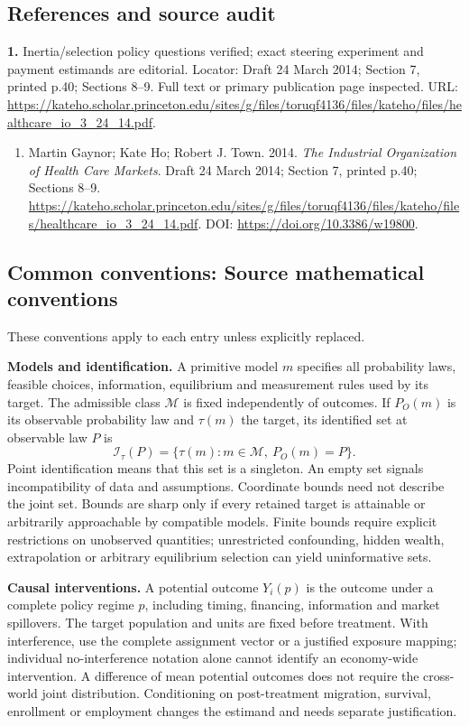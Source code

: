 \documentclass[11pt,a4paper]{article}
\begin{document}
\subsection*{References and source audit}
\textbf{1.} Inertia/selection policy questions verified; exact steering experiment and payment estimands are editorial. Locator: Draft 24 March 2014; Section 7, printed p.40; Sections 8–9. Full text or primary publication page inspected. URL: \url{https://kateho.scholar.princeton.edu/sites/g/files/toruqf4136/files/kateho/files/healthcare_io_3_24_14.pdf}.
\begin{enumerate}\raggedright
\item\hypertarget{definitions:source:30007726:1}{} Martin Gaynor; Kate Ho; Robert J. Town. 2014. \emph{The Industrial Organization of Health Care Markets}. Draft 24 March 2014; Section 7, printed p.40; Sections 8–9.
\url{https://kateho.scholar.princeton.edu/sites/g/files/toruqf4136/files/kateho/files/healthcare_io_3_24_14.pdf}.
DOI: \url{https://doi.org/10.3386/w19800}.
\end{enumerate}

\subsection*{Common conventions: Source mathematical conventions}

These conventions apply to each entry unless explicitly replaced.

\textbf{Models and identification.} A primitive model \(m\) specifies all probability laws, feasible choices, information, equilibrium and measurement rules used by its target. The admissible class \(\mathcal M\) is fixed independently of outcomes. If \(P_O(m)\) is its observable probability law and \(\tau(m)\) the target, its identified set at observable law \(P\) is
\[
 \mathcal I_\tau(P)=\{\tau(m):m\in\mathcal M,\ P_O(m)=P\}.
\]
Point identification means that this set is a singleton. An empty set signals incompatibility of data and assumptions. Coordinate bounds need not describe the joint set. Bounds are sharp only if every retained target is attainable or arbitrarily approachable by compatible models. Finite bounds require explicit restrictions on unobserved quantities; unrestricted confounding, hidden wealth, extrapolation or arbitrary equilibrium selection can yield uninformative sets.

\textbf{Causal interventions.} A potential outcome \(Y_i(p)\) is the outcome under a complete policy regime \(p\), including timing, financing, information and market spillovers. The target population and units are fixed before treatment. With interference, use the complete assignment vector or a justified exposure mapping; individual no-interference notation alone cannot identify an economy-wide intervention. A difference of mean potential outcomes does not require the cross-world joint distribution. Conditioning on post-treatment migration, survival, enrollment or employment changes the estimand and needs separate justification.
\end{document}
